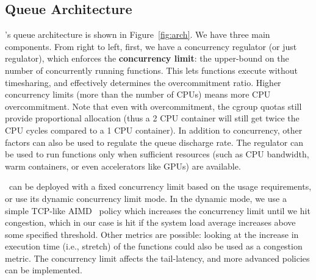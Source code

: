 \subsection{Queue Architecture}
\label{sec:q:arch}

\sysname's queue architecture is shown in Figure~\ref{fig:arch}.
We have three main components.
%
From right to left, first, we have a concurrency regulator (or just regulator), which enforces the \textbf{concurrency limit}: the  upper-bound on the number of concurrently running functions. 
%
This lets functions execute  without timesharing, and effectively determines the overcommitment ratio.
Higher concurrency limits (more than the number of CPUs) means  more CPU overcommitment.
Note that even with overcommitment, the cgroup quotas still provide proportional allocation (thus a 2 CPU container will still get twice the CPU cycles compared to a 1 CPU container). 
%
In addition to concurrency, other factors can also be used to regulate the queue discharge rate. 
The regulator can be used to run functions only when sufficient resources (such as CPU bandwidth, warm containers, or even accelerators like GPUs) are available. 


\sysname~can be deployed with a fixed concurrency limit based on the usage requirements, or use its dynamic concurrency limit mode. 
In the dynamic mode, we use a simple TCP-like AIMD~\cite{yang2000general} policy which increases the concurrency limit until we hit congestion, which in our case is hit if the system load average increases above some specified threshold. 
Other metrics are possible: looking at the increase in execution time (i.e., stretch) of the functions could also be used as a congestion metric.
The concurrency limit affects the tail-latency, and more advanced policies can be implemented. 


\begin{comment}
Having the container map also allows us to implement \textbf{concurrent cold-start mitigation}.
If the function at the head of the queue has no warm containers available, and one of its instantiations is running, then we put the function back in the queue.
As a function's warm start is typically orders of magnitude shorter than cold starts, it is better for it to wait for warm container than to cold start one.
We implement this by asking the container pool for a warm container, and if it fails to give us one we can re-queue the invocation for the future.
Optionally, we can allow for a cold start to increase the number of warm containers for a function, naturally scaling if there is an increase in frequency.
\end{comment}

